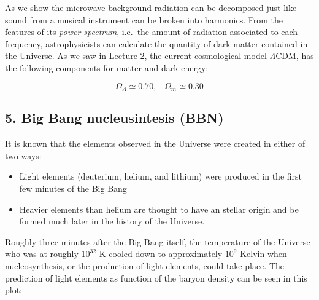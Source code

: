 \documentclass[
  letterpaper,
  DIV=11,
  numbers=noendperiod]{scrreprt}
\providecommand{\tightlist}{%
  \setlength{\itemsep}{0pt}\setlength{\parskip}{0pt}}\usepackage{longtable,booktabs,array}
\begin{document}
As we show the microwave background radiation can be decomposed just
like sound from a musical instrument can be broken into harmonics. From
the features of its \emph{power spectrum}, i.e.~the amount of radiation
associated to each frequency, astrophysicists can calculate the quantity
of dark matter contained in the Universe. As we saw in Lecture 2, the
current cosmological model \(\Lambda\)CDM, has the following components
for matter and dark energy:

\[\Omega_\Lambda \simeq 0.70, \;\;\; \Omega_{m} \simeq 0.30\]

\subsection{5. Big Bang nucleusintesis
(BBN)}\label{big-bang-nucleusintesis-bbn}

It is known that the elements observed in the Universe were created in
either of two ways:

\begin{itemize}
\tightlist
\item
  Light elements (deuterium, helium, and lithium) were produced in the
  first few minutes of the Big Bang
\item
  Heavier elements than helium are thought to have an stellar origin and
  be formed much later in the history of the Universe.
\end{itemize}

Roughly three minutes after the Big Bang itself, the temperature of the
Universe who was at roughly \(10^{32}\) K cooled down to approximately
\(10^9\) Kelvin when nucleosynthesis, or the production of light
elements, could take place. The prediction of light elements as function
of the baryon density can be seen in this plot:
\end{document}

